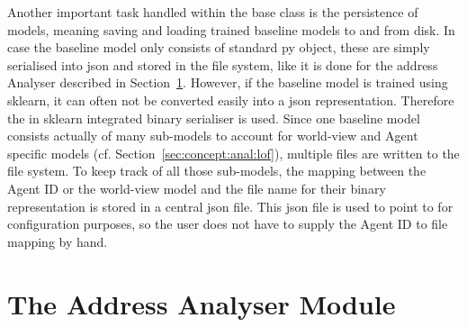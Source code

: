 Another important task handled within the base class is the persistence of models, meaning saving and loading trained baseline models to and from disk.
In case the baseline model only consists of standard \gls{py} object, these are simply serialised into \gls{json} and stored in the file system, like it is done for the address Analyser described in Section~\ref{sec:impl:addr}.
However, if the baseline model is trained using \gls{sklearn}, it can often not be converted easily into a \gls{json} representation. Therefore the in \gls{sklearn} integrated binary serialiser is used. Since one baseline model consists actually of many sub-models to account for world-view and Agent specific models (cf. Section~\ref{sec:concept:anal:lof}), multiple files are written to the file system. To keep track of all those sub-models, the mapping between the Agent ID or the world-view model and the file name for their binary representation is stored in a central \gls{json} file. This \gls{json} file is used to point to for configuration purposes, so the user does not have to supply the Agent ID to file mapping by hand.

\section{The Address Analyser Module}
\label{sec:impl:addr}

\begin{comment}
\begin{itemize}
	\item purpose is to detect the usage of prior unknown addresses
	\item (might) detect new (not malicious) devices
	\item stores all occurring source and destination addresses during the training period in a separately in a set
	\item set is stored to the disk using the standard \gls{py} \gls{json} serialiser
	\item during normal analytical operation the module checks if occurring addresses already occured in the training phase
	\item if not so counters are increased
	\item \todo{and list of unknown addresses is exported}
	\item exported metrics: \code{unknown\_src\_addr}, \code{unknown\_src\_telegrams}, \code{unknown\_dest\_addr}, \code{unknown\_dest\_telegrams}, \code{unknown\_addr}, \code{unknown\_telegrams}
\end{itemize}
\end{comment}

